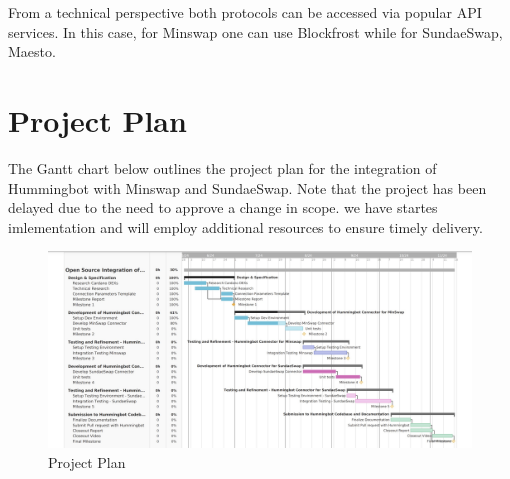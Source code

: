 \documentclass{scrreport}
\begin{document}
  From a technical perspective both protocols can be accessed via popular API services. In this case, for 
  Minswap one can use Blockfrost while for SundaeSwap, Maesto.

\section{Project Plan}

The Gantt chart below outlines the project plan for the integration of Hummingbot with Minswap and SundaeSwap. 
Note that the project has been delayed due to the need to approve a change in scope. we have startes imlementation and will employ additional resources to ensure timely delivery.

\begin{figure}[H]
  \centering
  \includegraphics[width=\textwidth]{Project plan.jpg}
  \caption{Project Plan}
  \label{fig:cardano_dex}
\end{figure}
\end{document}
